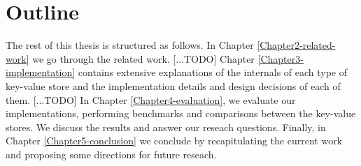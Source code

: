 \section{Outline}

The rest of this thesis is structured as follows. In Chapter \ref{Chapter2-related-work} we go through the related work. [...TODO]
Chapter \ref{Chapter3-implementation} contains extensive explanations of the internals of each type of key-value store and the implementation details and design decisions of each of them. [...TODO]
In Chapter \ref{Chapter4-evaluation}, we evaluate our implementations, performing benchmarks and comparisons between the key-value stores. We discuss the results and answer our reseach questions.
Finally, in Chapter \ref{Chapter5-conclusion} we conclude by recapitulating the current work and proposing some directions for future reseach. %
